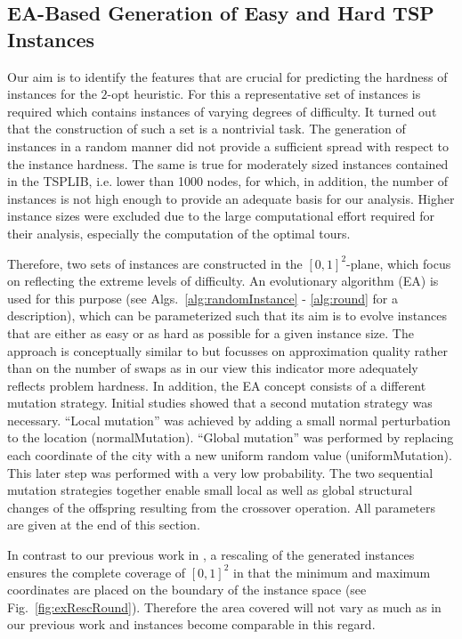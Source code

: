 \documentclass{article}
\begin{document}
\subsection{EA-Based Generation of Easy and Hard TSP Instances}
Our aim is to identify the features that are crucial for predicting
the hardness of instances for the $2$-opt heuristic. For this a
representative set of instances is required which contains instances
of varying degrees of difficulty. It turned out that the construction
of such a set is a nontrivial task. The generation of instances in a
random manner did not provide a sufficient spread with respect to the
instance hardness. The same is true for moderately sized instances
contained in the TSPLIB, i.e. lower than 1000 nodes, for which, in
addition, the number of instances is not high enough to provide an
adequate basis for our analysis. Higher instance sizes were excluded
due to the large computational effort required for their analysis,
especially the computation of the optimal tours.

Therefore, two sets of instances are constructed in the $[0,1]^2$-plane,
which focus on reflecting the extreme levels of difficulty.  An
evolutionary algorithm (EA) is used for this purpose (see
Algs.~\ref{alg:randomInstance} - \ref{alg:round} for a description),
which can be parameterized such that its aim is to evolve instances
that are either as easy or as hard as possible for a given instance
size. The approach is conceptually similar to \cite{SMHL10} but
focusses on approximation quality rather than on the number of swaps
as in our view this indicator more adequately reflects problem
hardness. In addition, the EA concept consists of a different mutation
strategy. Initial studies showed that a second mutation strategy was
necessary. ``Local mutation'' was achieved by adding a small normal
perturbation to the location (normalMutation). ``Global mutation'' was
performed by replacing each coordinate of the city with a new uniform
random value (uniformMutation). This later step was performed with a
very low probability. The two sequential mutation strategies together
enable small local as well as global structural changes of the
offspring resulting from the crossover operation. All parameters are
given at the end of this section.

In contrast to our previous work in \cite{mersmann2012}, a rescaling
of the generated instances ensures the complete coverage of $[0,1]^2$
in that the minimum and maximum coordinates are placed on the boundary
of the instance space (see Fig.~\ref{fig:exRescRound}). Therefore the
area covered will not vary as much as in our previous work and
instances become comparable in this regard.
\end{document}
